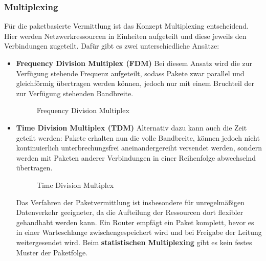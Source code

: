 \documentclass[11pt,a4paper]{scrartcl}
\begin{document}
\subsubsection{Multiplexing}
Für die paketbasierte Vermittlung ist das Konzept Multiplexing entscheidend. Hier werden Netzwerkressourcen in Einheiten aufgeteilt und diese jeweils den Verbindungen zugeteilt. Dafür gibt es zwei unterschiedliche Ansätze:
\begin{itemize}
\item \textbf{Frequency Division Multiplex (FDM)}
Bei diesem Ansatz wird die zur Verfügung stehende Frequenz aufgeteilt, sodass Pakete zwar parallel und gleichförmig übertragen werden können, jedoch nur mit einem Bruchteil der zur Verfügung stehenden Bandbreite.
\begin{figure}[h]
\centering
{}
\caption{Frequency Division Multiplex}
\end{figure}
\item \textbf{Time Division Multiplex (TDM)}
Alternativ dazu kann auch die Zeit geteilt werden: Pakete erhalten nun die volle Bandbreite, können jedoch nicht kontinuierlich unterbrechungsfrei aneinandergereiht versendet werden, sondern werden mit Paketen anderer Verbindungen in einer Reihenfolge abwechselnd übertragen.
\begin{figure}[h]
\centering
{}
\caption{Time Division Multiplex}
\end{figure}
Das Verfahren der Paketvermittlung ist insbesondere für unregelmäßigen Datenverkehr geeigneter, da die Aufteilung der Ressourcen dort flexibler gehandhabt werden kann. Ein Router empfägt ein Paket komplett, bevor es in einer Warteschlange zwischengespeichert wird und bei Freigabe der Leitung weitergesendet wird. Beim \textbf{statistischen Multiplexing} gibt es kein festes Muster der Paketfolge.
\end{itemize}
\end{document}
